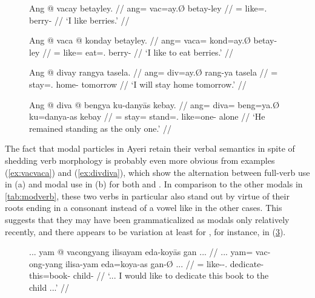 \begin{figure}[h]
\pex\label{ex:vacvaca}
\a\label{ex:vacfull}\begingl
	\gla Ang @ vacay betayley. //
	\glb ang= vac=ay.Ø betay-ley //
	\glc \AgtT{}= like=\Fsg{}.\Top{} berry-\PargI{} //
	\glft `I like berries.' //
\endgl

\a\label{ex:vacamod}\begingl
	\gla Ang @ vaca @ konday betayley. //
	\glb ang= vaca= kond=ay.Ø betay-ley //
	\glc \AgtT{}= like= eat=\Fsg{}.\Top{} berry-\PargI{} //
	\glft `I like to eat berries.' //
\endgl
\xe
\end{figure}

\begin{figure}[h]
\pex\label{ex:divdiva}
\a\label{ex:divfull}\begingl
	\gla Ang @ divay rangya tasela. //
	\glb ang= div=ay.Ø rang-ya tasela //
	\glc \AgtT{}= stay=\Fsg{}.\Top{} home-\Loc{} tomorrow //
	\glft `I will stay home tomorrow.' //
\endgl

\a\label{ex:divamod}\begingl
	\gla Ang @ diva @ bengya ku-danyās kebay. //
	\glb ang= diva= beng=ya.Ø ku=danya-as kebay //
	\glc \AgtT{}= stay= stand=\TsgM{}.\Top{} like=one-\Parg{} alone //
	\glft `He remained standing as the only one.' //
\endgl
\xe
\end{figure}

The fact that modal particles in Ayeri retain their verbal semantics in spite
of shedding verb morphology is probably even more obvious from examples
(\ref{ex:vacvaca}) and (\ref{ex:divdiva}), which show the alternation between
full-verb use in (a) and modal use in (b) for both  and
. In comparison to the other modals in 
\autoref{tab:modverb}, these two verbs in particular also stand out by virtue 
of their roots ending in a consonant instead of a vowel like in the other 
cases. This suggests that they may have been grammaticalized as modals 
only relatively recently, and there appears to be variation at least for 
, for instance, in (\ref{ex:vacmodfull}).

\begin{figure}[h]
\ex\label{ex:vacmodfull}\begingl
	\gla ... yam @ vacongyang ilisayam eda-koyās gan ... //
	\glb ... yam= vac-ong-yang ilisa-yam eda=koya-as gan-Ø ... //
	\glc {} \DatT{}= like-\Irr{}-\Fsg{}.\Aarg{} dedicate-\Ptcp{} 		
		this=book-\Parg{} child-\Top{} {} //
	\glft `... I would like to dedicate this book to the child ...' 
		 //
\endgl\xe
\end{figure}

